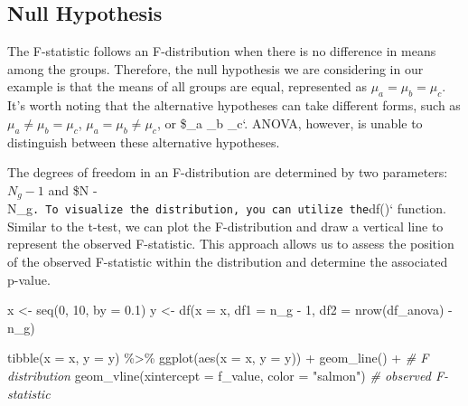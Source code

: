 \documentclass[
]{book}
\newenvironment{Shaded}{\begin{snugshade}}{\end{snugshade}}
\newcommand{\AttributeTok}[1]{\textcolor[rgb]{0.77,0.63,0.00}{#1}}
\newcommand{\CommentTok}[1]{\textcolor[rgb]{0.56,0.35,0.01}{\textit{#1}}}
\newcommand{\DecValTok}[1]{\textcolor[rgb]{0.00,0.00,0.81}{#1}}
\newcommand{\FloatTok}[1]{\textcolor[rgb]{0.00,0.00,0.81}{#1}}
\newcommand{\FunctionTok}[1]{\textcolor[rgb]{0.00,0.00,0.00}{#1}}
\newcommand{\NormalTok}[1]{#1}
\newcommand{\OtherTok}[1]{\textcolor[rgb]{0.56,0.35,0.01}{#1}}
\newcommand{\SpecialCharTok}[1]{\textcolor[rgb]{0.00,0.00,0.00}{#1}}
\newcommand{\StringTok}[1]{\textcolor[rgb]{0.31,0.60,0.02}{#1}}
\begin{document}
\hypertarget{null-hypothesis-1}{%
\subsection{Null Hypothesis}\label{null-hypothesis-1}}

The F-statistic follows an F-distribution when there is no difference in means among the groups. Therefore, the null hypothesis we are considering in our example is that the means of all groups are equal, represented as \(\mu_a = \mu_b = \mu_c\). It's worth noting that the alternative hypotheses can take different forms, such as \(\mu_a \ne \mu_b = \mu_c\), \(\mu_a = \mu_b \ne \mu_c\), or \$\mu\_a \ne \mu\_b \ne \mu\_c`. ANOVA, however, is unable to distinguish between these alternative hypotheses.

The degrees of freedom in an F-distribution are determined by two parameters: \(N_g - 1\) and \$N - N\_g\texttt{.\ To\ visualize\ the\ distribution,\ you\ can\ utilize\ the}df()` function. Similar to the t-test, we can plot the F-distribution and draw a vertical line to represent the observed F-statistic. This approach allows us to assess the position of the observed F-statistic within the distribution and determine the associated p-value.

\begin{Shaded}
\begin{Highlighting}[]
\NormalTok{x }\OtherTok{\textless{}{-}} \FunctionTok{seq}\NormalTok{(}\DecValTok{0}\NormalTok{, }\DecValTok{10}\NormalTok{, }\AttributeTok{by =} \FloatTok{0.1}\NormalTok{)}
\NormalTok{y }\OtherTok{\textless{}{-}} \FunctionTok{df}\NormalTok{(}\AttributeTok{x =}\NormalTok{ x, }\AttributeTok{df1 =}\NormalTok{ n\_g }\SpecialCharTok{{-}} \DecValTok{1}\NormalTok{, }\AttributeTok{df2 =} \FunctionTok{nrow}\NormalTok{(df\_anova) }\SpecialCharTok{{-}}\NormalTok{ n\_g)}

\FunctionTok{tibble}\NormalTok{(}\AttributeTok{x =}\NormalTok{ x, }\AttributeTok{y =}\NormalTok{ y) }\SpecialCharTok{\%\textgreater{}\%} 
  \FunctionTok{ggplot}\NormalTok{(}\FunctionTok{aes}\NormalTok{(}\AttributeTok{x =}\NormalTok{ x,}
             \AttributeTok{y =}\NormalTok{ y)) }\SpecialCharTok{+} 
  \FunctionTok{geom\_line}\NormalTok{() }\SpecialCharTok{+} \CommentTok{\# F distribution}
  \FunctionTok{geom\_vline}\NormalTok{(}\AttributeTok{xintercept =}\NormalTok{ f\_value,}
             \AttributeTok{color =} \StringTok{"salmon"}\NormalTok{) }\CommentTok{\# observed F{-}statistic}
\end{Highlighting}
\end{Shaded}
\end{document}
